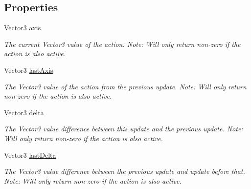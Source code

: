 \subsection*{Properties}
\begin{DoxyCompactItemize}
\item 
Vector3 \mbox{\hyperlink{class_valve_1_1_v_r_1_1_steam_v_r___action___vector3___source_a03b9a87aac9a83a60aeab6dde0bddaf7}{axis}}
\begin{DoxyCompactList}\small\item\em The current Vector3 value of the action. Note\+: Will only return non-\/zero if the action is also active. \end{DoxyCompactList}\item 
Vector3 \mbox{\hyperlink{class_valve_1_1_v_r_1_1_steam_v_r___action___vector3___source_a6746385376c909af457b3c2573a95607}{last\+Axis}}
\begin{DoxyCompactList}\small\item\em The Vector3 value of the action from the previous update. Note\+: Will only return non-\/zero if the action is also active. \end{DoxyCompactList}\item 
Vector3 \mbox{\hyperlink{class_valve_1_1_v_r_1_1_steam_v_r___action___vector3___source_a873631911364f757a5d24f079d190e44}{delta}}
\begin{DoxyCompactList}\small\item\em The Vector3 value difference between this update and the previous update. Note\+: Will only return non-\/zero if the action is also active. \end{DoxyCompactList}\item 
Vector3 \mbox{\hyperlink{class_valve_1_1_v_r_1_1_steam_v_r___action___vector3___source_a481d2d0170d4ad25e13fa4c7898eefbd}{last\+Delta}}
\begin{DoxyCompactList}\small\item\em The Vector3 value difference between the previous update and update before that. Note\+: Will only return non-\/zero if the action is also active. \end{DoxyCompactList}\item 

\end{DoxyCompactItemize}
